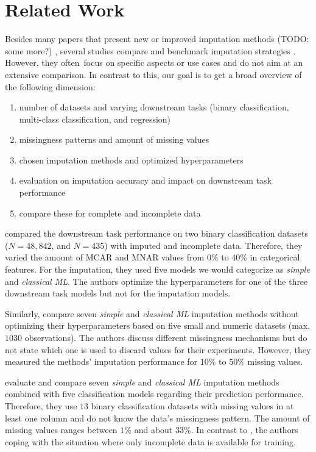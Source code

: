 \section{Related Work}

Besides many papers that present new or improved imputation methods (TODO: some more?) \citep{Imputation_Benchmark_4, Imputation_Benchmark_6}, several studies compare and benchmark imputation strategies \citep{Imputation_Benchmark_1, Imputation_Benchmark_2, Imputation_Benchmark_3}. However, they often focus on specific aspects or use cases and do not aim at an extensive comparison. In contrast to this, our goal is to get a broad overview of the following  dimension:
%
\begin{enumerate}
	\item number of datasets and varying downstream tasks (binary classification, multi-class classification, and regression)
	\item missingness patterns and amount of missing values
	\item chosen imputation methods and optimized hyperparameters
	\item evaluation on imputation accuracy and impact on downstream task performance
	\item compare these for complete and incomplete data
\end{enumerate}

\cite{Imputation_Benchmark_3} compared the downstream task performance on two binary classification datasets ($N = 48,842$, and $N = 435$) with imputed and incomplete data. Therefore, they varied the amount of MCAR and MNAR values from $0\%$ to $40\%$ in categorical features. For the imputation, they used five models we would categorize as \emph{simple} and \emph{classical ML}. The authors optimize the hyperparameters for one of the three downstream task models but not for the imputation models.

Similarly, \cite{Imputation_Benchmark_2} compare seven \emph{simple} and \emph{classical ML} imputation methods without optimizing their hyperparameters based on five small and numeric datasets (max. $1030$ observations). The authors discuss different missingness mechanisms but do not state which one is used to discard values for their experiments. However, they measured the methods' imputation performance for $10\%$ to $50\%$ missing values.

\cite{Imputation_Benchmark_1} evaluate and compare seven \emph{simple} and \emph{classical ML} imputation methods combined with five classification models regarding their prediction performance. Therefore,  they use $13$ binary classification datasets with missing values in at least one column and do not know the data's missingness pattern. The amount of missing values ranges between $1\%$ and about $33\%$. In contrast to \citep{Imputation_Benchmark_3, Imputation_Benchmark_2}, the authors coping with the situation where only incomplete data is available for training.

